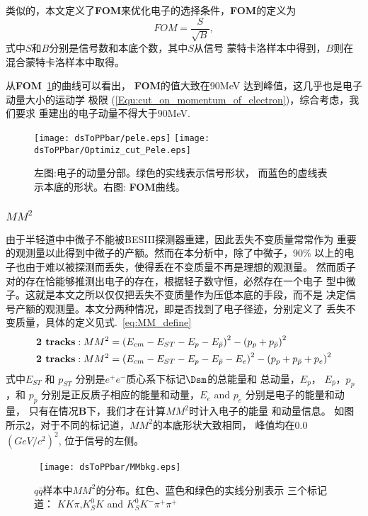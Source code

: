 类似的，本文定义了\textbf{FOM}来优化电子的选择条件，\textbf{FOM}的定义为
\begin{equation}
    FOM = \frac{S}{\sqrt{B}}, 
    \label{eq:FOM-ele}
\end{equation}
式中$S$和$B$分别是信号数和本底个数，其中$S$从信号
蒙特卡洛样本中得到，$B$则在混合蒙特卡洛样本中取得。

从\textbf{FOM}~\ref{Fig:pele}的曲线可以看出，
\textbf{FOM}的值大致在90MeV
达到峰值，这几乎也是电子动量大小的运动学
极限 (\ref{Equ:cut_on_momentum_of_electron})，综合考虑，我们要求 
重建出的电子动量不得大于90MeV. 
\begin{figure}[htbp]
    \centering
    \texttt{[image: dsToPPbar/pele.eps]}
    \texttt{[image: dsToPPbar/Optimiz\_cut\_Pele.eps]}
    \caption{左图:电子的动量分部。绿色的实线表示信号形状，
    而蓝色的虚线表示本底的形状。右图: \textbf{FOM}曲线。
    }%
    \label{Fig:pele}
\end{figure}

\subsubsection{$MM^{2}$}
由于半轻道中中微子不能被BESIII探测器重建，因此丢失不变质量常常作为
重要的观测量以此得到中微子的产额。然而在本分析中，除了中微子，90\%
以上的电子也由于难以被探测而丢失，使得丢在不变质量不再是理想的观测量。
然而质子对的存在恰能够推测出电子的存在，根据轻子数守恒，必然存在一个电子
型中微子。这就是本文之所以仅仅把丢失不变质量作为压低本底的手段，而不是
决定信号产额的观测量。本文分两种情况，即是否找到了电子径迹，分别定义了
丢失不变质量，具体的定义见式.~\ref{eq:MM_define}
\begin{equation}
    \begin{aligned}
        \label{eq:MM_define}
        \textbf{2 tracks}: 
        MM^{2} &= {\left( E_{cm} -  E_{ST} - E_{p} - E_{\bar{p}} \right)}^{2} 
        -{\left( p_{p} + p_{\bar{p}} \right) }^{2} 
        \notag \\
        \textbf{2 tracks}:
        MM^{2} &= {\left( E_{cm} -  E_{ST} -E_{p} -E_{\bar{p}} - E_{e}
        \right)} ^{2} - {\left(p_{p} + p_{\bar{p}}  + p_{e} \right)}^{2}
    \end{aligned}
\end{equation}
式中$E_{ST}$ 和 $p_{ST}$ 分别是$e^{+}e^{-}$质心系下标记$\Dsm$的总能量和
总动量，$E_{p}$， $E_{\bar{p}}$，$p_{p}$，和 $p_{\bar{p}}$ 
分别是正反质子相应的能量和动量，$E_{e}$ and $p_{e}$ 分别是电子的能量和动量，
只有在情况\textbf{B}下，我们才在计算$MM^{2}$时计入电子的能量
和动量信息。
如图所示\ref{fig:MMbkg}，对于不同的标记道，$MM^{2}$的本底形状大致相同，
峰值均在0.0 ${(GeV/c^{2})}^{2}$, 位于信号的左侧。
\begin{figure}[htbp]
    \begin{center}
    \mbox{%
        \texttt{[image: dsToPPbar/MMbkg.eps]}
    }
    \end{center}
    \caption{$q\bar{q}$样本中$MM^{2}$的分布。红色、蓝色和绿色的实线分别表示
    三个标记道：
    $KK\pi$,$K_{S}^{0}K$ and $K_{S}^{0}K^{-}\pi^{+}\pi^{+}$
    }\label{fig:MMbkg}
\end{figure}

